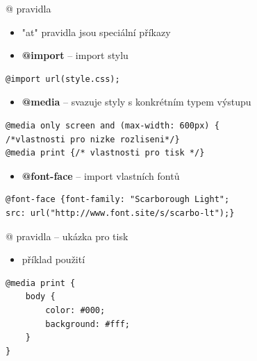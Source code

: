 \documentclass{beamer}
\begin{document}
\begin{frame}[fragile, shrink=0]{@ pravidla}
  \begin{itemize}
	\item "at" pravidla jsou speciální příkazy
\end{itemize} 

\begin{itemize}
	\item \textbf{@import} -- import stylu
\end{itemize}
\begin{lstlisting}[language=HTML]
@import url(style.css);
\end{lstlisting}

\begin{itemize}
	\item \textbf{@media} -- svazuje styly s konkrétním typem výstupu
\end{itemize}
\begin{lstlisting}[language=HTML]
@media only screen and (max-width: 600px) {
/*vlastnosti pro nizke rozliseni*/}
@media print {/* vlastnosti pro tisk */} 
\end{lstlisting}

\begin{itemize}
	\item \textbf{@font-face} -- import vlastních fontů
\end{itemize}
\begin{lstlisting}[language=HTML]
@font-face {font-family: "Scarborough Light"; 
src: url("http://www.font.site/s/scarbo-lt");}
\end{lstlisting}
\end{frame}

\begin{frame}[fragile, shrink=0]{@ pravidla -- ukázka pro tisk}
\begin{itemize}
	\item příklad použití
\end{itemize} 


\begin{lstlisting}[language=HTML]
@media print {
    body {
        color: #000;
        background: #fff;
    }
}
\end{lstlisting}


\end{frame}
\end{document}

